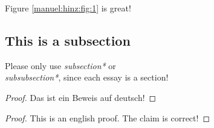 \begin{otherlanguage}{ngerman}
Figure \ref{manuel:hinz:fig:1} is great!

\subsection*{This is a subsection}

Please only use \textit{subsection*} or \textit{\\subsubsection*}, since each essay is a section!



\begin{proof}
Das ist ein Beweis auf deutsch!
\end{proof}

\printbibliography
{}
\end{otherlanguage}
\begin{proof}
This is an english proof. The claim is correct!    
\end{proof}

